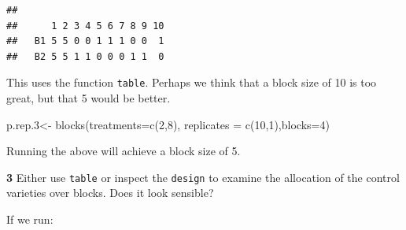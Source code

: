 \documentclass[
]{book}
\makeatletter
\newenvironment{Shaded}{\begin{snugshade}}{\end{snugshade}}
\newcommand{\AttributeTok}[1]{\textcolor[rgb]{0.77,0.63,0.00}{#1}}
\newcommand{\DecValTok}[1]{\textcolor[rgb]{0.00,0.00,0.81}{#1}}
\newcommand{\FloatTok}[1]{\textcolor[rgb]{0.00,0.00,0.81}{#1}}
\newcommand{\FunctionTok}[1]{\textcolor[rgb]{0.00,0.00,0.00}{#1}}
\newcommand{\NormalTok}[1]{#1}
\newcommand{\OtherTok}[1]{\textcolor[rgb]{0.56,0.35,0.01}{#1}}
\newcommand{\SpecialCharTok}[1]{\textcolor[rgb]{0.00,0.00,0.00}{#1}}
\newenvironment{kframe}{%
\medskip{}
\setlength{\fboxsep}{.8em}
 \def\at@end@of@kframe{}%
 \ifinner\ifhmode%
  \def\at@end@of@kframe{\end{minipage}}%
  \begin{minipage}{\columnwidth}%
 \fi\fi%
 \def\FrameCommand##1{\hskip\@totalleftmargin \hskip-\fboxsep
 \colorbox{shadecolor}{##1}\hskip-\fboxsep
     \hskip-\linewidth \hskip-\@totalleftmargin \hskip\columnwidth}%
 \MakeFramed {\advance\hsize-\width
   \@totalleftmargin\z@ \linewidth\hsize
   \@setminipage}}%
 {\par\unskip\endMakeFramed%
 \at@end@of@kframe}
\newenvironment{rmdblock}[1]
  {
  \begin{itemize}
  \renewcommand{\labelitemi}{
    \raisebox{-.7\height}[0pt][0pt]{
      {\setkeys{Gin}{width=3em,keepaspectratio}\texttt{[image: images/\#1]}}
    }
  }
  \setlength{\fboxsep}{1em}
  \begin{kframe}
  \item
  }
  {
  \end{kframe}
  \end{itemize}
  }
\newenvironment{rmdquiz}
  {\begin{rmdblock}{quiz}}
  {\end{rmdblock}}
\makeatother
\begin{document}
\begin{Shaded}
\end{Shaded}

\begin{verbatim}
##     
##      1 2 3 4 5 6 7 8 9 10
##   B1 5 5 0 0 1 1 1 0 0  1
##   B2 5 5 1 1 0 0 0 1 1  0
\end{verbatim}

This uses the function \texttt{table}. Perhaps we think that a block size of 10 is too great, but that 5 would be better.

\begin{Shaded}
\begin{Highlighting}[]
\NormalTok{p.rep}\FloatTok{.3}\OtherTok{\textless{}{-}} \FunctionTok{blocks}\NormalTok{(}\AttributeTok{treatments=}\FunctionTok{c}\NormalTok{(}\DecValTok{2}\NormalTok{,}\DecValTok{8}\NormalTok{), }\AttributeTok{replicates =} \FunctionTok{c}\NormalTok{(}\DecValTok{10}\NormalTok{,}\DecValTok{1}\NormalTok{),}\AttributeTok{blocks=}\DecValTok{4}\NormalTok{)}
\end{Highlighting}
\end{Shaded}

Running the above will achieve a block size of 5.

\begin{rmdquiz}
\textbf{3} Either use \texttt{table} or inspect the \texttt{design} to examine the allocation of the control varieties over blocks. Does it look sensible?
\end{rmdquiz}

If we run:

\begin{Shaded}
\end{Shaded}
\end{document}
